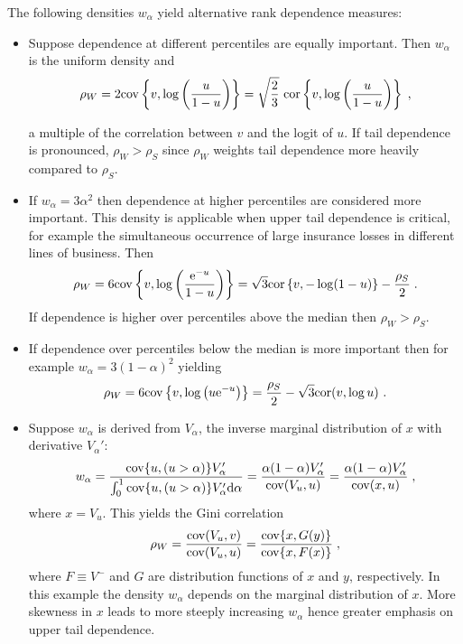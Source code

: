 \documentclass[authoryear]{elsarticle}
\newcommand{\cov}{{\rm cov}}
\newcommand{\cor}{\mathrm{cor}}
\newcommand{\e}{\mathrm{e}}
\newcommand{\de}{\mathrm{d}}
\begin{document}
The following densities $w_\alpha$ yield alternative rank dependence measures:
\begin{itemize}

\item Suppose dependence at different percentiles are equally important.   Then $w_\alpha$ is the uniform density and
$$
\rho_W =2\cov\left\{v,\log\left(\frac{u}{1-u}\right)\right\}
= \sqrt{\frac{2}{3}}\ \cor\left\{v,\log\left(\frac{u}{1-u}\right)\right\} \;,
$$

a multiple of the correlation between $v$ and the logit of $u$. If tail dependence is pronounced, $\rho_W>\rho_S$ since $\rho_W$ weights tail dependence more heavily compared to $\rho_S$.

\item If $w_\alpha=3\alpha^2$  then dependence at higher percentiles are considered more important. This density is applicable when upper tail dependence is critical, for example the simultaneous occurrence of large insurance losses in different lines of business. Then
$$
\rho_W = 6\cov\left\{v,\log\left(\frac{\e^{-u}}{1-u}\right) \right\}
=\sqrt{3} \cor\left\{v,-\log(1-u)\right\}-\frac{\rho_S}{2}\;.
$$
If dependence is higher over percentiles above the median then $\rho_W>\rho_S$.

\item If dependence over percentiles below the median is more important then for example  $w_\alpha=3(1-\alpha)^2$ yielding
$$
\rho_W = 6\cov\left\{v,\log \left( u \e^{-u}\right) \right\}
= \frac{\rho_S}{2}  - \sqrt{3}\cor(v,\log u ) \ .
$$


\item Suppose $w_\alpha$ is derived from $V_\alpha$, the inverse marginal distribution of $x$ with derivative $V_\alpha'$:
$$
w_\alpha = \frac{\cov\{u,(u>\alpha)\}V_\alpha'}{\int_0^1 \cov\{u,(u>\alpha)\}V_\alpha' \de\alpha}
=\frac{\alpha(1-\alpha)V_\alpha'}{\cov(V_u,u)}
=\frac{\alpha(1-\alpha)V_\alpha'}{\cov(x,u)} \;,
$$
where $x=V_u$. This yields the Gini correlation  \citep{schechtman1999proper}
$$
\rho_W=\frac{\cov(V_u,v)}{\cov(V_u,u)} = \frac{\cov\{x,G(y)\}}{\cov\{x,F(x)\}} \;,
$$
where $F\equiv V^-$ and $G$ are distribution functions of $x$ and $y$, respectively.  In this example the density $w_\alpha$ depends on the marginal distribution of $x$. More skewness in $x$ leads to more steeply increasing $w_\alpha$ hence greater emphasis on upper tail dependence.

\end{itemize}
\end{document}
